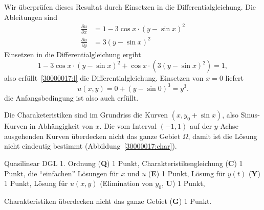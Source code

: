 \begin{loesung}
\begin{teilaufgaben}
Wir überprüfen dieses Resultat durch Einsetzen in die Differentialgleichung.
Die Ableitungen sind
\begin{align*}
\frac{\partial u}{\partial x}
&=
1 - 3 \cos x\cdot(y-\sin x)^2
\\
\frac{\partial u}{\partial y}
&=
3(y-\sin x)^2
\end{align*}
Einsetzen in die Differentialgleichung ergibt
\[
1 - 3 \cos x\cdot(y-\sin x)^2
+
\cos x
\cdot
(
3(y-\sin x)^2
)
=
1,
\]
also erfüllt~\eqref{30000017:l} die Differentialgleichung.
Einsetzen von $x=0$ liefert
\[
u(x,y)
=
0 + (y-\sin 0)^3 = y^3.
\]
die Anfangsbedingung ist also auch erfüllt.
\item
Die Charaketeristiken sind im Grundriss die Kurven $(x, y_0+\sin x)$, also
Sinus-Kurven in Abhängigkeit von $x$.
Die vom Interval $(-1,1)$ auf der $y$-Achse ausgehenden Kurven überdecken
nicht das ganze
Gebiet $\Omega$, damit ist die Lösung nicht eindeutig bestimmt
(Abbildung~\ref{30000017:char}).
\qedhere
\end{teilaufgaben}
\end{loesung}

\begin{bewertung}
\begin{teilaufgaben}
\item
Quasilinear DGL 1. Ordnung ({\bf Q}) 1 Punkt,
Charakteristikengleichung ({\bf C}) 1 Punkt,
die ``einfachen'' Lösungen für $x$ und $u$ ({\bf E}) 1 Punkt,
Lösung für $y(t)$ ({\bf Y}) 1 Punkt,
Lösung für $u(x,y)$ (Elimination von $y_0$, {\bf U}) 1 Punkt,
\item
Charakteristiken überdecken nicht das ganze Gebiet ({\bf G}) 1 Punkt.
\end{teilaufgaben}
\end{bewertung}
